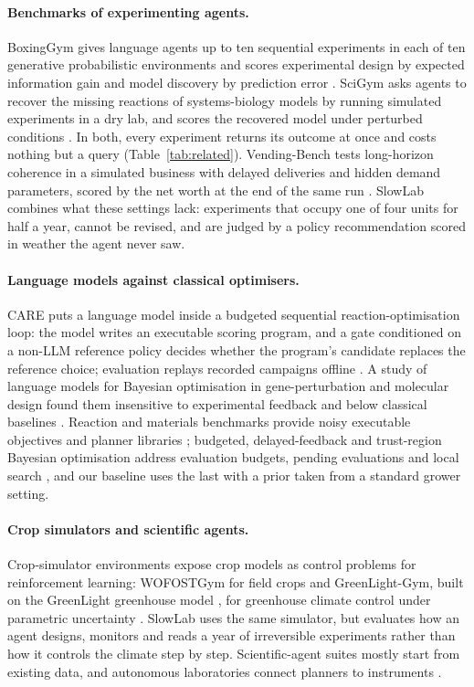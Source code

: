 \paragraph{Benchmarks of experimenting agents.} BoxingGym gives language agents up to ten sequential experiments in each of ten generative probabilistic environments and scores experimental design by expected information gain and model discovery by prediction error \citep{boxinggym}. SciGym asks agents to recover the missing reactions of systems-biology models by running simulated experiments in a dry lab, and scores the recovered model under perturbed conditions \citep{scigym}. In both, every experiment returns its outcome at once and costs nothing but a query (Table~\ref{tab:related}). Vending-Bench tests long-horizon coherence in a simulated business with delayed deliveries and hidden demand parameters, scored by the net worth at the end of the same run \citep{vendingbench}. SlowLab combines what these settings lack: experiments that occupy one of four units for half a year, cannot be revised, and are judged by a policy recommendation scored in weather the agent never saw.

\paragraph{Language models against classical optimisers.} CARE puts a language model inside a budgeted sequential reaction-optimisation loop: the model writes an executable scoring program, and a gate conditioned on a non-LLM reference policy decides whether the program's candidate replaces the reference choice; evaluation replays recorded campaigns offline \citep{care2026}. A study of language models for Bayesian optimisation in gene-perturbation and molecular design found them insensitive to experimental feedback and below classical baselines \citep{llmbo2025}. Reaction and materials benchmarks provide noisy executable objectives and planner libraries \citep{summit,olympus,minerva}; budgeted, delayed-feedback and trust-region Bayesian optimisation address evaluation budgets, pending evaluations and local search \citep{astudillo2021budgeted,verma2022delayed,eriksson2019turbo}, and our baseline uses the last with a prior taken from a standard grower setting.

\paragraph{Crop simulators and scientific agents.} Crop-simulator environments expose crop models as control problems for reinforcement learning: WOFOSTGym for field crops \citep{wofostgym} and GreenLight-Gym, built on the GreenLight greenhouse model \citep{katzin2020greenlight}, for greenhouse climate control under parametric uncertainty \citep{vanlaatum2025greenlightgym}. SlowLab uses the same simulator, but evaluates how an agent designs, monitors and reads a year of irreversible experiments rather than how it controls the climate step by step. Scientific-agent suites mostly start from existing data, and autonomous laboratories connect planners to instruments \citep{scienceagentbench,discoverybench,coscientist,chemcrow,szymanski2023autonomous,burger2020mobile}.
